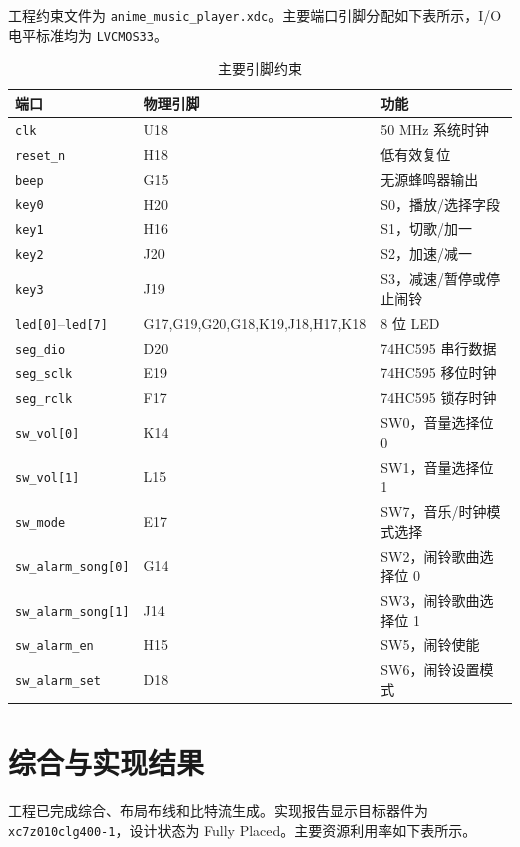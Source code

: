\documentclass[UTF8,a4paper,12pt]{ctexart}
\begin{document}
工程约束文件为 \verb|anime_music_player.xdc|。主要端口引脚分配如下表所示，I/O 电平标准均为 \verb|LVCMOS33|。

\begin{table}[H]
  \centering
  \caption{主要引脚约束}
  \begin{tabular}{lll}
    \toprule
    端口 & 物理引脚 & 功能 \\
    \midrule
    \verb|clk| & U18 & 50 MHz 系统时钟 \\
    \verb|reset_n| & H18 & 低有效复位 \\
    \verb|beep| & G15 & 无源蜂鸣器输出 \\
    \verb|key0| & H20 & S0，播放/选择字段 \\
    \verb|key1| & H16 & S1，切歌/加一 \\
    \verb|key2| & J20 & S2，加速/减一 \\
    \verb|key3| & J19 & S3，减速/暂停或停止闹铃 \\
    \verb|led[0]|--\verb|led[7]| & G17,G19,G20,G18,K19,J18,H17,K18 & 8 位 LED \\
    \verb|seg_dio| & D20 & 74HC595 串行数据 \\
    \verb|seg_sclk| & E19 & 74HC595 移位时钟 \\
    \verb|seg_rclk| & F17 & 74HC595 锁存时钟 \\
    \verb|sw_vol[0]| & K14 & SW0，音量选择位 0 \\
    \verb|sw_vol[1]| & L15 & SW1，音量选择位 1 \\
    \verb|sw_mode| & E17 & SW7，音乐/时钟模式选择 \\
    \verb|sw_alarm_song[0]| & G14 & SW2，闹铃歌曲选择位 0 \\
    \verb|sw_alarm_song[1]| & J14 & SW3，闹铃歌曲选择位 1 \\
    \verb|sw_alarm_en| & H15 & SW5，闹铃使能 \\
    \verb|sw_alarm_set| & D18 & SW6，闹铃设置模式 \\
    \bottomrule
  \end{tabular}
\end{table}

\section{综合与实现结果}

工程已完成综合、布局布线和比特流生成。实现报告显示目标器件为 \verb|xc7z010clg400-1|，设计状态为 Fully Placed。主要资源利用率如下表所示。
\end{document}
